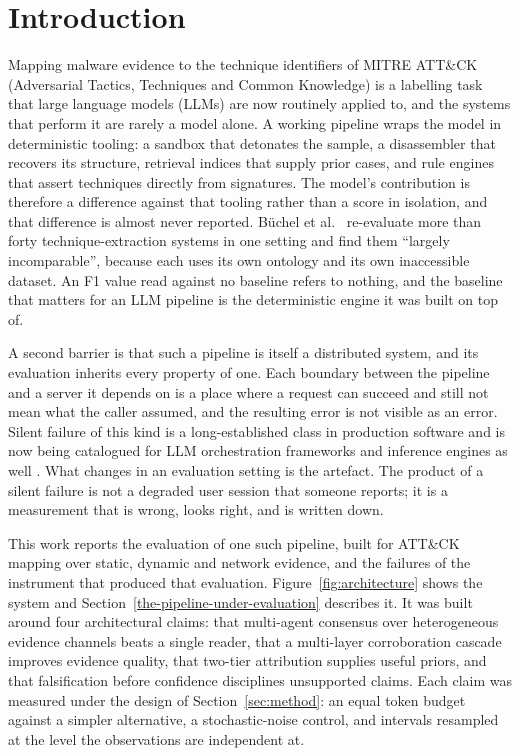 \section{Introduction}
\label{sec:intro}

Mapping malware evidence to the technique identifiers of MITRE ATT\&CK (Adversarial Tactics,
Techniques and Common Knowledge) is a labelling task that large language models (LLMs) are now
routinely applied to, and the systems that perform it are rarely a model alone. A working pipeline wraps the model in deterministic tooling: a sandbox that detonates the
sample, a disassembler that recovers its structure, retrieval indices that supply prior cases, and
rule engines that assert techniques directly from signatures. The model's contribution is therefore
a difference against that tooling rather than a score in isolation, and that difference is almost
never reported. B\"uchel et al.~\cite{buchel2025sok} re-evaluate more than forty technique-extraction systems in
one setting and find them ``largely incomparable'', because each uses its own ontology and its own
inaccessible dataset. An F1 value read against no baseline refers
to nothing, and the baseline that matters for an LLM pipeline is the deterministic engine it was
built on top of.

A second barrier is that such a pipeline is itself a distributed system, and its evaluation inherits
every property of one. Each boundary between the pipeline and a server it depends on is a place
where a request can succeed and still not mean what the caller assumed, and the resulting error is
not visible as an error. Silent failure of this kind is a long-established class in production
software \citep{gunawi2008eio,yuan2014simple,alquraan2018partition} and is now being catalogued for
LLM orchestration frameworks and inference engines as well \citep{xue2025agentbugs,liu2026inference}.
What changes in an evaluation setting is the artefact. The product of a silent failure is not a
degraded user session that someone reports; it is a measurement that is wrong, looks right, and is
written down.

This work reports the evaluation of one such pipeline, built for ATT\&CK mapping over static,
dynamic and network evidence, and the failures of the instrument that produced that evaluation.
Figure~\ref{fig:architecture} shows the system and Section~\ref{the-pipeline-under-evaluation}
describes it. It was built around four
architectural claims: that multi-agent consensus over heterogeneous evidence channels beats a single
reader, that a multi-layer corroboration cascade improves evidence quality, that two-tier
attribution supplies useful priors, and that falsification before confidence disciplines unsupported
claims. Each claim was measured under the design of Section~\ref{sec:method}: an equal token budget against
a simpler alternative, a stochastic-noise control, and intervals resampled at the level the
observations are independent at.

